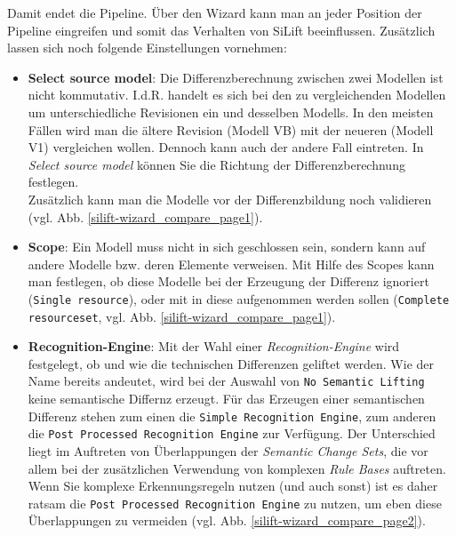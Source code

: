\documentclass[a4paper]{scrartcl}
\begin{document}
Damit endet die Pipeline.
Über den Wizard kann man an jeder Position der Pipeline eingreifen und somit das Verhalten von SiLift beeinflussen. Zusätzlich lassen sich noch folgende Einstellungen vornehmen:
\begin{itemize}

\item \textbf{Select source model}: Die Differenzberechnung zwischen zwei Modellen ist nicht kommutativ.
I.d.R. handelt es sich bei den zu vergleichenden Modellen um unterschiedliche Revisionen ein und desselben Modells.
In den meisten Fällen wird man die ältere Revision (Modell VB) mit der neueren (Modell V1) vergleichen wollen.
Dennoch kann auch der andere Fall eintreten.
In \textit{Select source model} können Sie die Richtung der Differenzberechnung festlegen.\\
Zusätzlich kann man die Modelle vor der Differenzbildung noch validieren (vgl. Abb. \ref{silift-wizard_compare_page1}).


\item \textbf{Scope}: Ein Modell muss nicht in sich geschlossen sein, sondern kann auf andere Modelle bzw. deren Elemente verweisen.
Mit Hilfe des Scopes kann man festlegen, ob diese Modelle bei der Erzeugung der Differenz ignoriert (\texttt{Single resource}), oder mit in diese aufgenommen werden sollen (\texttt{Complete resourceset}, vgl. Abb. \ref{silift-wizard_compare_page1}).


\item \textbf{Recognition-Engine}: Mit der Wahl einer \textit{Recognition-Engine} wird festgelegt, ob und wie die technischen Differenzen geliftet werden.
Wie der Name bereits andeutet, wird bei der Auswahl von \texttt{No Semantic Lifting} keine semantische Differnz erzeugt.
Für das Erzeugen einer semantischen Differenz stehen zum einen die \texttt{Simple Recognition Engine}, zum anderen die \texttt{Post Processed Recognition Engine} zur Verfügung.
Der Unterschied liegt im Auftreten von Überlappungen der \textit{Semantic Change Sets}, die vor allem bei der zusätzlichen Verwendung von komplexen \textit{Rule Bases} auftreten.
Wenn Sie komplexe Erkennungsregeln nutzen (und auch sonst) ist es daher ratsam die \texttt{Post Processed Recognition Engine} zu nutzen, um eben diese Überlappungen zu vermeiden (vgl. Abb. \ref{silift-wizard_compare_page2}).

\end{itemize}
\end{document}
